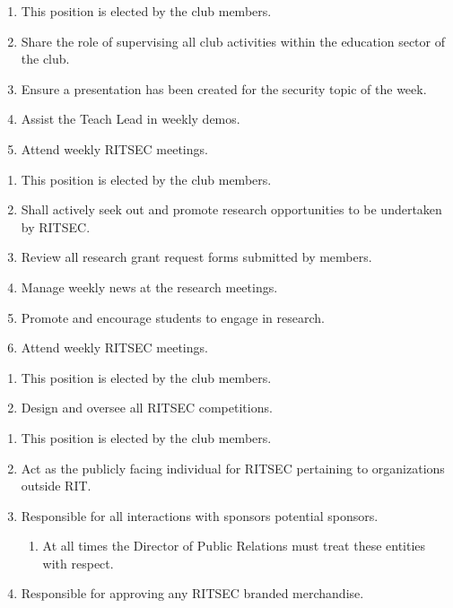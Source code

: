 
\begin{enumerate}
  \item This position is elected by the club members.
  \item Share the role of supervising all club activities within the education
    sector of the club.
  \item Ensure a presentation has been created for the security topic of the
    week.
  \item Assist the Teach Lead in weekly demos.
  \item Attend weekly RITSEC meetings.
\end{enumerate}


\begin{enumerate}
  \item This position is elected by the club members.
  \item Shall actively seek out and promote research opportunities to be
    undertaken by RITSEC.
  \item Review all research grant request forms submitted by members. 
  \item Manage weekly news at the research meetings.
  \item Promote and encourage students to engage in research.
  \item Attend weekly RITSEC meetings.
\end{enumerate}


\begin{enumerate}
  \item This position is elected by the club members.
  \item Design and oversee all RITSEC competitions.
\end{enumerate}


\begin{enumerate}
  \item This position is elected by the club members.
  \item Act as the publicly facing individual for RITSEC pertaining to
    organizations outside RIT.
  \item Responsible for all interactions with sponsors potential sponsors.
  \begin{enumerate}
    \item At all times the Director of Public Relations must treat these
      entities with respect.
  \end{enumerate}
  \item Responsible for approving any RITSEC branded merchandise.
\end{enumerate}

